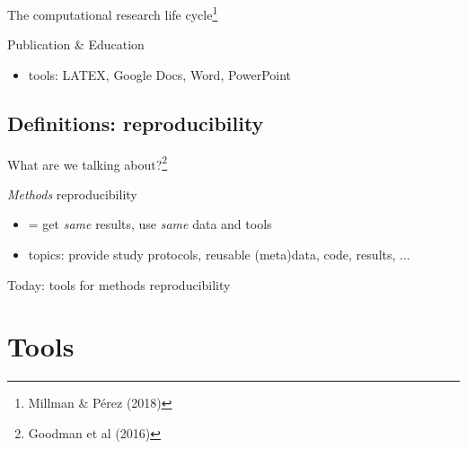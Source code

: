 \documentclass[10pt,aspectratio=169]{beamer}
\begin{document}
\begin{frame}{The computational research life cycle\footnote{Millman & Pérez (2018)}}
{\begin{itemize}
\begin{Block}{Publication \& Education}
{\begin{itemize}
            \item tools: LATEX, Google Docs, Word, PowerPoint
        \end{itemize}}
    \end{Block}
\end{itemize}
}

\end{frame}

\subsection{Definitions: reproducibility}
\begin{frame}{What are we talking about?\footnote{Goodman et al (2016)}}
    \begin{Block}{\textit{Methods} reproducibility}
        \begin{itemize}
            \item = get \textit{same} results, use \textit{same} data and tools
            \item topics: provide study protocols, reusable (meta)data, code,
              results, ...
        \end{itemize}
    \end{Block}
    \begin{alertblock}{Today: tools for methods reproducibility}
    \end{alertblock}
\end{frame}

\section{Tools}
\end{document}
